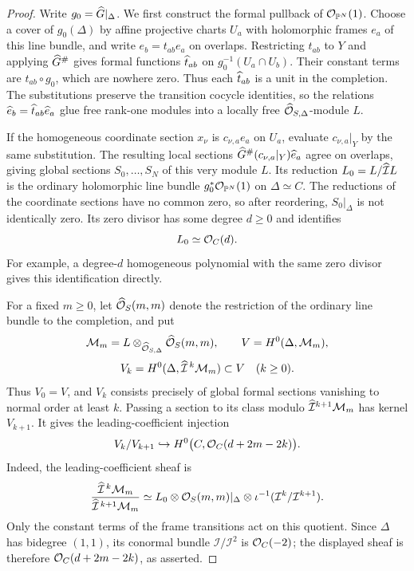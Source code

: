 \begin{proof}
Write \(g_0=\widehat G|_\Delta\). We first construct the formal pullback
of \(\mathcal O_{\mathbb P^N}(1)\). Choose a cover of \(g_0(\Delta)\) by
affine projective charts \(U_a\) with holomorphic frames \(e_a\)
of this line bundle, and write \(e_b=t_{ab}e_a\) on overlaps.
Restricting \(t_{ab}\) to \(Y\) and applying \(\widehat G^\#\) gives
formal functions \(\widehat t_{ab}\) on
\(g_0^{-1}(U_a\cap U_b)\). Their constant terms are
\(t_{ab}\circ g_0\), which are nowhere zero. Thus each
\(\widehat t_{ab}\) is a unit in the completion. The substitutions
preserve the transition cocycle identities, so the relations
\(\widehat e_b=\widehat t_{ab}\widehat e_a\) glue free rank-one modules into a
locally free \(\widehat{\mathcal O}_{S,\Delta}\)-module \(L\).

If the homogeneous coordinate section \(x_\nu\) is
\(c_{\nu,a}e_a\) on \(U_a\), evaluate \(c_{\nu,a}|_Y\) by the
same substitution. The resulting local sections
\(\widehat G^\#(c_{\nu,a}|_Y)\widehat e_a\) agree on overlaps, giving global
sections \(S_0,\ldots,S_N\) of this very module \(L\).
Its reduction \(L_0=L/\widehat{\mathcal I}L\) is the ordinary
holomorphic line bundle \(g_0^*\mathcal O_{\mathbb P^N}(1)\) on \(\Delta\simeq C\).
The reductions of the coordinate sections have no common zero, so
after reordering, \(S_0|_\Delta\) is not identically zero. Its zero
divisor has some degree \(d\ge0\) and identifies
\[
L_0\simeq\mathcal O_C(d).
\]
For example, a degree-\(d\) homogeneous polynomial with the same
zero divisor gives this identification directly.

For a fixed \(m\ge0\), let \(\widehat{\mathcal O}_S(m,m)\) denote the restriction of
the ordinary line bundle to the completion, and put
\[
\mathcal M_m=L\otimes_{\widehat{\mathcal O}_{S,\Delta}}\widehat{\mathcal O}_S(m,m),
\qquad V=H^0(\Delta,\mathcal M_m),
\]
\[
V_k=H^0(\Delta,\widehat{\mathcal I}^{\,k}\mathcal M_m)\subset V
\quad(k\ge0).
\]
Thus \(V_0=V\), and \(V_k\) consists precisely of global formal
sections vanishing to normal order at least \(k\). Passing a section
to its class modulo \(\widehat{\mathcal I}^{k+1}\mathcal M_m\) has
kernel \(V_{k+1}\). It gives the leading-coefficient injection
\begin{equation}\label{eq:graded}
V_k/V_{k+1}\hookrightarrow
H^0\bigl(C,\mathcal O_C(d+2m-2k)\bigr).
\end{equation}
Indeed, the leading-coefficient sheaf is
\[
\frac{\widehat{\mathcal I}^{\,k}\mathcal M_m}
     {\widehat{\mathcal I}^{\,k+1}\mathcal M_m}
\simeq L_0\otimes\mathcal O_S(m,m)|_\Delta
             \otimes\iota^{-1}(\mathcal I^k/\mathcal I^{k+1}).
\]
Only the constant terms of the frame transitions act on this
quotient. Since \(\Delta\) has bidegree \((1,1)\), its conormal
bundle \(\mathcal I/\mathcal I^2\) is \(\mathcal O_C(-2)\); the displayed
sheaf is therefore \(\mathcal O_C(d+2m-2k)\), as asserted.


\end{proof}
